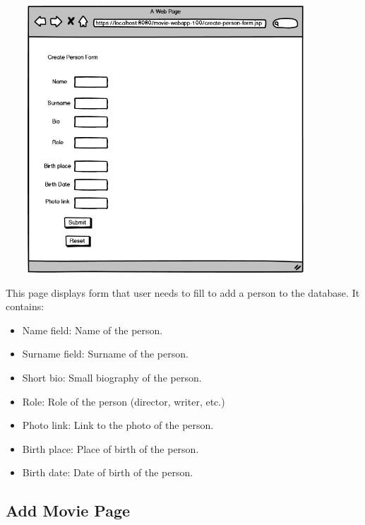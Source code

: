 \begin{center}
\includegraphics[width=12cm, height=10cm]{pictures/Create Person Form.png}
\end{center}


This page displays form that user needs to fill to add a person to the database. It contains:
\begin{itemize}
\item Name field: Name of the person.
\item Surname field: Surname of the person.
\item  Short bio: Small biography of the person.
\item  Role: Role of the person (director, writer, etc.)
\item  Photo link: Link to the photo of the person.
\item  Birth place: Place of birth of the person.
\item  Birth date: Date of birth of the person.
\end{itemize}

\subsection{Add Movie Page}

